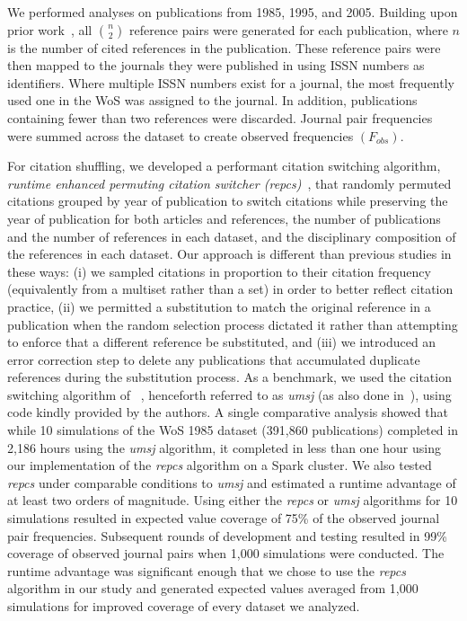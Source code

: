 \documentclass[NETN]{stjour}
\begin{document}
We performed analyses on publications from 1985, 1995, and 2005. Building upon prior work~\citep{uzzi_atypical_2013}, all ${n \choose 2}$ reference pairs were generated for each publication, where $n$ is the number of cited references in the publication. These reference pairs were then mapped to the journals they were published in using ISSN numbers as identifiers. Where multiple ISSN numbers exist for a journal, the most frequently used one in the WoS was assigned to the journal. In addition, publications containing fewer than two references were discarded. Journal pair frequencies were summed across the dataset to create observed frequencies $(F_{obs})$. 

For citation shuffling, we developed a performant citation switching algorithm, \emph{runtime enhanced permuting citation switcher (repcs)}~\citep{GithubERNIE2019}, that randomly permuted citations grouped by year of publication to switch citations while preserving the year of publication for both articles and references, the number of publications and the number of references in each dataset, and the disciplinary composition of the references in each dataset. 
Our approach is different than previous studies in these ways: (i) we sampled citations in proportion to their citation frequency (equivalently from a multiset rather than a set) in order to better reflect citation practice, 
(ii) we permitted a substitution to match the original reference in a publication when the random selection process dictated it rather than attempting to enforce that a different reference be substituted, and (iii) we introduced an error correction step to delete any publications that accumulated duplicate references during the substitution process. 
As a benchmark, we used the citation switching algorithm of ~\cite{uzzi_atypical_2013}, henceforth referred to  as \emph{umsj} (as also done in~\cite{boyack_vs_uzzi_2014}), using code kindly provided by the authors. A single comparative analysis showed that while 10 simulations of the WoS 1985 dataset (391,860 publications) completed in 2,186 hours using the \emph{umsj} algorithm, it completed in less than one hour using our implementation of the \emph{repcs}   algorithm on a Spark  cluster. We also tested \emph{repcs}  under comparable conditions to \emph{umsj} and estimated a runtime advantage of at least two orders of magnitude. Using either the \emph{repcs}   or \emph{umsj} algorithms for 10 simulations resulted in expected value coverage of 75\% of the observed journal pair frequencies. Subsequent rounds of development and testing resulted in 99\% coverage of observed journal pairs when 1,000 simulations were conducted. The runtime advantage was significant enough that we chose to use the \emph{repcs}   algorithm in our study  and generated expected values averaged from 1,000 simulations for improved coverage of every dataset we analyzed. 
\end{document}
